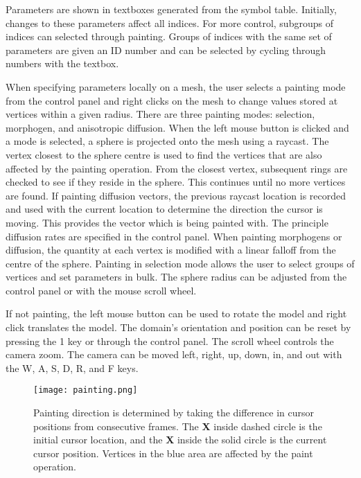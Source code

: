 Parameters are shown in textboxes generated from the symbol table. Initially, changes to these parameters affect all indices. For more control, subgroups of indices can selected through painting. Groups of indices with the same set of parameters are given an ID number and can be selected by cycling through numbers with the  textbox. 

When specifying parameters locally on a mesh, the user selects a painting mode from the control panel and right clicks on the mesh to change values stored at vertices within a given radius. There are three painting modes: selection, morphogen, and anisotropic diffusion. When the left mouse button is clicked and a mode is selected, a sphere is projected onto the mesh using a raycast. The vertex closest to the sphere centre is used to find the vertices that are also affected by the painting operation. From the closest vertex, subsequent rings are checked to see if they reside in the sphere. This continues until no more vertices are found. If painting diffusion vectors, the previous raycast location is recorded and used with the current location to determine the direction the cursor is moving. This provides the vector which is being painted with.  The principle diffusion rates are specified in the control panel. When painting morphogens or diffusion, the quantity at each vertex is modified with a linear falloff from the centre of the sphere. Painting in selection mode allows the user to select groups of vertices and set parameters in bulk. The sphere radius can be adjusted from the control panel or with the mouse scroll wheel.

If not painting, the left mouse button can be used to rotate the model and right click translates the model. The domain's orientation and position can be reset by pressing the 1 key or through the control panel. The scroll wheel controls the camera zoom. The camera can be moved left, right, up, down, in, and out with the W, A, S, D, R, and F keys.

\begin{figure}[ht]
	\centering
	\texttt{[image: painting.png]}	
	\caption{Painting direction is determined by taking the difference in cursor positions from consecutive frames. The \textbf{X} inside dashed circle is the initial cursor location, and the \textbf{X} inside the solid circle is the current cursor position. Vertices in the blue area are affected by the paint operation.} 
	\label{fig:painting}
\end{figure}

